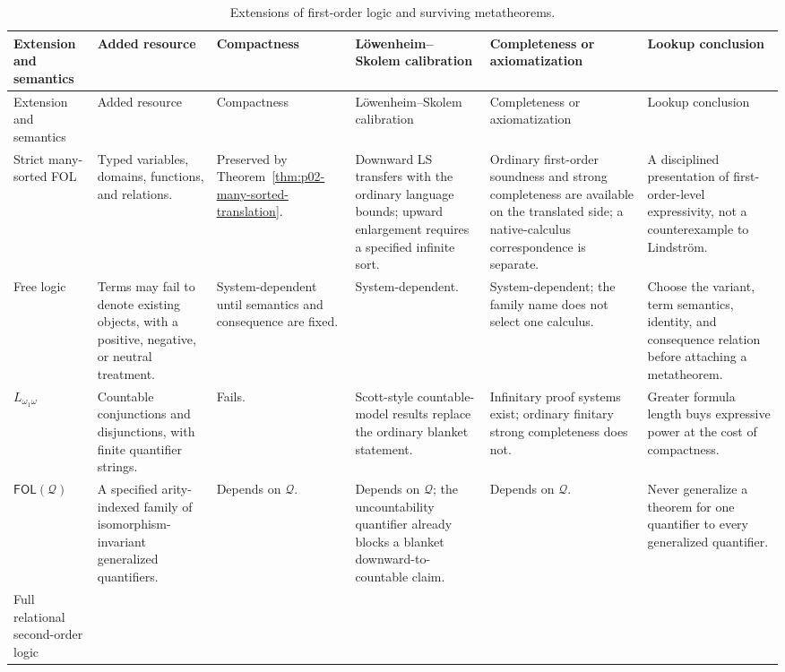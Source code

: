 \begin{landscape}
\begingroup\tiny\setlength{\tabcolsep}{2pt}
\begin{longtable}{@{}p{.85in}p{1.25in}p{.80in}p{1.05in}p{1.55in}p{1.55in}@{}}
\caption{Extensions of first-order logic and surviving metatheorems.}
\label{tab:p02-fol-extensions}\\
\toprule
Extension and semantics & Added resource & Compactness & L\"owenheim--Skolem calibration & Completeness or axiomatization & Lookup conclusion \\ \midrule
\endfirsthead
\toprule
Extension and semantics & Added resource & Compactness & L\"owenheim--Skolem calibration & Completeness or axiomatization & Lookup conclusion \\ \midrule
\endhead
Strict many-sorted FOL &
Typed variables, domains, functions, and relations. &
Preserved by Theorem~\ref{thm:p02-many-sorted-translation}. &
Downward LS transfers with the ordinary language bounds; upward enlargement
requires a specified infinite sort. &
Ordinary first-order soundness and strong completeness are available on the
translated side; a native-calculus correspondence is separate. &
A disciplined presentation of first-order-level expressivity, not a
counterexample to Lindstr\"om. \\
\addlinespace
Free logic &
Terms may fail to denote existing objects, with a positive, negative, or
neutral treatment. &
System-dependent until semantics and consequence are fixed. &
System-dependent. &
System-dependent; the family name does not select one calculus. &
Choose the variant, term semantics, identity, and consequence relation before
attaching a metatheorem. \\
\addlinespace
\(L_{\omega_1\omega}\) &
Countable conjunctions and disjunctions, with finite quantifier strings. &
Fails. &
Scott-style countable-model results replace the ordinary blanket statement. &
Infinitary proof systems exist; ordinary finitary strong completeness does not. &
Greater formula length buys expressive power at the cost of compactness. \\
\addlinespace
\(\mathsf{FOL}(\mathcal Q)\) &
A specified arity-indexed family of isomorphism-invariant generalized quantifiers. &
Depends on \(\mathcal Q\). &
Depends on \(\mathcal Q\); the uncountability quantifier already blocks a blanket
downward-to-countable claim. &
Depends on \(\mathcal Q\). &
Never generalize a theorem for one quantifier to every generalized quantifier. \\
\addlinespace
Full relational second-order logic &

\end{longtable}
\end{landscape}
